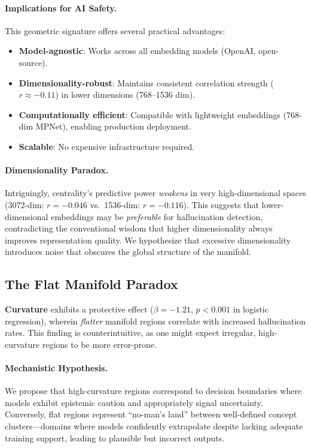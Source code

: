 \documentclass{article}
\begin{document}
\paragraph{Implications for AI Safety.}
This geometric signature offers several practical advantages:
\begin{itemize}
    \item \textbf{Model-agnostic}: Works across all embedding models (OpenAI, open-source).
    \item \textbf{Dimensionality-robust}: Maintains consistent correlation strength ($r \approx -0.11$) in lower dimensions (768--1536 dim).
    \item \textbf{Computationally efficient}: Compatible with lightweight embeddings (768-dim MPNet), enabling production deployment.
    \item \textbf{Scalable}: No expensive infrastructure required.
\end{itemize}
\paragraph{Dimensionality Paradox.}
Intriguingly, centrality's predictive power \textit{weakens} in very high-dimensional spaces (3072-dim: $r=-0.046$ vs.~1536-dim: $r=-0.116$). This suggests that lower-dimensional embeddings may be \textit{preferable} for hallucination detection, contradicting the conventional wisdom that higher dimensionality always improves representation quality. We hypothesize that excessive dimensionality introduces noise that obscures the global structure of the manifold.
\subsection{The Flat Manifold Paradox}
\textbf{Curvature} exhibits a protective effect ($\beta=-1.21$, $p<0.001$ in logistic regression), wherein \textit{flatter} manifold regions correlate with increased hallucination rates. This finding is counterintuitive, as one might expect irregular, high-curvature regions to be more error-prone.
\paragraph{Mechanistic Hypothesis.}
We propose that high-curvature regions correspond to decision boundaries where models exhibit epistemic caution and appropriately signal uncertainty. Conversely, flat regions represent ``no-man's land'' between well-defined concept clusters---domains where models confidently extrapolate despite lacking adequate training support, leading to plausible but incorrect outputs. 
\end{document}
